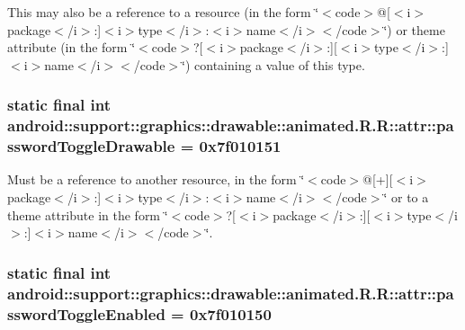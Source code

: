 This may also be a reference to a resource (in the form \char`\"{}$<$code$>$@\mbox{[}$<$i$>$package$<$/i$>$:\mbox{]}$<$i$>$type$<$/i$>$:$<$i$>$name$<$/i$>$$<$/code$>$\char`\"{}) or theme attribute (in the form \char`\"{}$<$code$>$?\mbox{[}$<$i$>$package$<$/i$>$:\mbox{]}\mbox{[}$<$i$>$type$<$/i$>$:\mbox{]}$<$i$>$name$<$/i$>$$<$/code$>$\char`\"{}) containing a value of this type. \hypertarget{classandroid_1_1support_1_1graphics_1_1drawable_1_1animated_1_1_r_1_1attr_004111a3cc5a8a656ffc9e2cd5a5b1c5}{
\subsubsection[{passwordToggleDrawable}]{\setlength{\rightskip}{0pt plus 5cm}static final int android::support::graphics::drawable::animated.R.R::attr::passwordToggleDrawable = 0x7f010151}}
\label{classandroid_1_1support_1_1graphics_1_1drawable_1_1animated_1_1_r_1_1attr_004111a3cc5a8a656ffc9e2cd5a5b1c5}


Must be a reference to another resource, in the form \char`\"{}$<$code$>$@\mbox{[}+\mbox{]}\mbox{[}$<$i$>$package$<$/i$>$:\mbox{]}$<$i$>$type$<$/i$>$:$<$i$>$name$<$/i$>$$<$/code$>$\char`\"{} or to a theme attribute in the form \char`\"{}$<$code$>$?\mbox{[}$<$i$>$package$<$/i$>$:\mbox{]}\mbox{[}$<$i$>$type$<$/i$>$:\mbox{]}$<$i$>$name$<$/i$>$$<$/code$>$\char`\"{}. \hypertarget{classandroid_1_1support_1_1graphics_1_1drawable_1_1animated_1_1_r_1_1attr_b308181e48788e289785ce156d2f9f36}{
\subsubsection[{passwordToggleEnabled}]{\setlength{\rightskip}{0pt plus 5cm}static final int android::support::graphics::drawable::animated.R.R::attr::passwordToggleEnabled = 0x7f010150}}
\label{classandroid_1_1support_1_1graphics_1_1drawable_1_1animated_1_1_r_1_1attr_b308181e48788e289785ce156d2f9f36}


